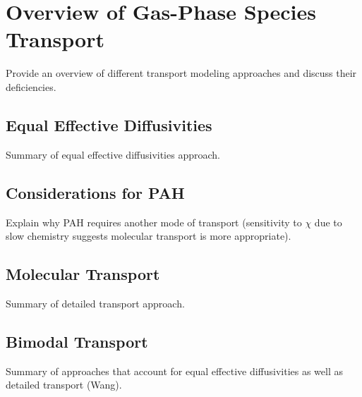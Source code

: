 \section{Overview of Gas-Phase Species Transport}
\label{sec:transport:overview}

Provide an overview of different transport modeling approaches and discuss their deficiencies.


\subsection{Equal Effective Diffusivities}
\label{sec:transport:overview:le1}

Summary of equal effective diffusivities approach.


\subsection{Considerations for PAH}
\label{sec:transport:overview:pah}

Explain why PAH requires another mode of transport (sensitivity to $\chi$ due to slow chemistry suggests molecular transport is more appropriate).


\subsection{Molecular Transport}
\label{sec:transport:overview:lei}

Summary of detailed transport approach.


\subsection{Bimodal Transport}
\label{sec:transport:overview:bimodal}

Summary of approaches that account for equal effective diffusivities as well as detailed transport (Wang).
